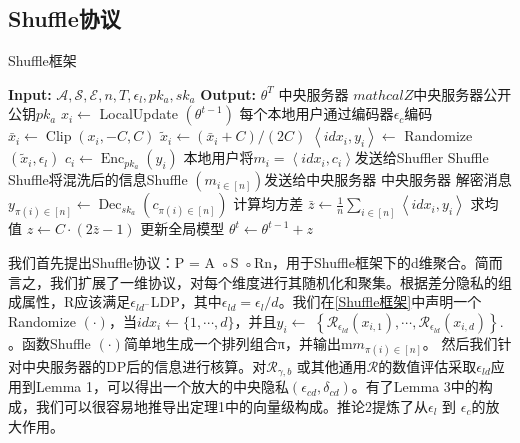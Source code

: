 \subsection{Shuffle协议}
\begin{algorithm}[!htb]
  \caption{Shuffle框架}
  \label{Shuffle框架}
  \begin{algorithmic}[1]
    \footnotesize
    \STATE \textbf{Input:} $\mathcal{A}, \mathcal{S}, \mathcal{E}, n, T, \epsilon_{l}, p k_{a}, s k_{a}$
    \STATE \textbf{Output:} $\theta^{T}$
      \STATE 中央服务器 $mathcal{Z}$中央服务器公开公钥$p k_{a}$
          \STATE $x_{i} \leftarrow$ LocalUpdate $\left(\theta^{t-1}\right)$
          \STATE 每个本地用户通过编码器$\epsilon_{c}$编码
          \STATE $\bar{x}_{i} \leftarrow \operatorname{Clip}\left(x_{i},-C, C\right)$
          \STATE $\tilde{x}_{i} \leftarrow\left(\bar{x}_{i}+C\right) /(2 C)$
          \STATE $\left\langle i d x_{i}, y_{i}\right\rangle \leftarrow$ Randomize $\left(\tilde{x}_{i}, \epsilon_{l}\right)$
          \STATE $c_{i} \leftarrow \operatorname{Enc}_{p k_{a}}\left(y_{i}\right)$
          \STATE 本地用户将$m_{i}=\left\langle i d x_{i}, c_{i}\right\rangle$发送给Shuffler
        \ENDFOR
      \STATE Shuffle
      \STATE Shuffle将混洗后的信息Shuffle $\left(m_{i \in[n]}\right)$发送给中央服务器
      \STATE 中央服务器
      \STATE 解密消息 $y_{\pi(i) \in[n]} \leftarrow \operatorname{Dec}_{s k_{a}}\left(c_{\pi(i) \in[n]}\right)$
      \STATE 计算均方差 $\bar{z} \leftarrow \frac{1}{n} \sum_{i \in[n]}\left\langle i d x_{i}, y_{i}\right\rangle$
      \STATE 求均值 $z \leftarrow C \cdot(2 \bar{z}-1)$
      \STATE 更新全局模型 $\theta^{t} \leftarrow \theta^{t-1}+z$
  \end{algorithmic}
\end{algorithm}

我们首先提出Shuffle协议：P = A ◦S ◦Rn，用于Shuffle框架下的d维聚合。简而言之，我们扩展了一维协议，对每个维度进行其随机化和聚集。根据差分隐私的组成属性，R应该满足$\epsilon_{l d^{-}}$LDP，其中$\epsilon_{l d}=\epsilon_{l} / d$。我们在\ref{Shuffle框架}中声明一个Randomize $(\cdot)$，当$i d x_{i} \leftarrow\{1, \cdots, d\}$，并且$y_{i} \leftarrow$ $\left\{\mathcal{R}_{\epsilon_{l d}}\left(x_{i, 1}\right), \cdots, \mathcal{R}_{\epsilon_{l d}}\left(x_{i, d}\right)\right\} .$。函数Shuffle $(\cdot)$简单地生成一个排列组合π，并输出m$m_{\pi(i) \in[n]}$。
然后我们针对中央服务器的DP后的信息进行核算。对$\mathcal{R}_{\gamma, b}$ 或其他通用$\mathcal{R}$的数值评估采取$\epsilon_{l d}$应用到Lemma 1，可以得出一个放大的中央隐私$\left(\epsilon_{c d}, \delta_{c d}\right)$。有了Lemma 3中的构成，我们可以很容易地推导出定理1中的向量级构成。推论2提炼了从$\epsilon_{l}$ 到 $\epsilon_{c}$的放大作用。

